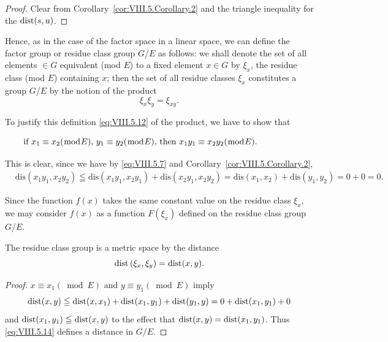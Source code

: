 \begin{proof}
 Clear from Corollary~\ref{cor:VIII.5.Corollary.2} and the triangle inequality for the $\operatorname{dist}(s, u)$. 
\end{proof}

Hence, as in the case of the factor space in a linear space, we can define the factor group or residue class group $G$/$E$ as follows: we shall denote the set of all elements $\in G$ equivalent (mod $E$) to a fixed element $x \in G$ by $\xi_{x}$, the residue class (mod $E$) containing $x$; then the set of all residue classes $\xi_{x}$ constitutes a group $G$/$E$ by the notion of the product 
\begin{equation}\label{eq:VIII.5.12}
\xi_{x} \xi_{y} = \xi_{xy}.
\end{equation}

To justify this definition \eqref{eq:VIII.5.12} of the product, we have to show that 

\begin{equation}\label{eq:VIII.5.13}
\begin{minipage}[b]{0.92\linewidth}
if $x_{1} \equiv x_{2} (\bmod E)$, $y_{1} \equiv y_{2} (\bmod E)$, then $x_{1}y_{1} \equiv x_{2}y_{2} (\bmod E)$.
\end{minipage}
\end{equation}

This is clear, since we have by \eqref{eq:VIII.5.7} and Corollary~\ref{cor:VIII.5.Corollary.2}, 
\[
\begin{aligned}
&\mathrm{dis} (x _{1} y _{1}, x _{2} y _{2})  \leqq \mathrm{dis} (x _{1} y _{1}, x _{2} y _{1}) + \mathrm{dis} (x _{2} y _{1}, x _{2} y _{2}) = \mathrm{dis} (x _{1}, x _{2}) + \mathrm{dis} (y _{1}, y _{2}) = 0 + 0 = 0.
\end{aligned}
\]

Since the function $f(x)$ takes the same constant value on the residue class $\xi_{x}$, we may consider $f(x)$ as a function $F(\xi_{x})$ defined on the residue class group $G$/$E$. 

\begin{corollary}\label{cor:VIII.5.Corollary.4} The residue class group is a metric space by the distance 
\begin{equation}\label{eq:VIII.5.14}
\operatorname{dist} \left(\xi_{x}, \xi_{y}\right) = \operatorname{dist} (x, y).
\end{equation}
\end{corollary}

\begin{proof}
 $x \equiv x_{1} (\bmod E)$ and $y \equiv y_{1} (\bmod E)$ imply 
\[
\operatorname{dist} (x, y) \leqq \operatorname{dist} (x, x _{1}) + \operatorname{dist} (x _{1}, y _{1}) + \operatorname{dist} (y _{1}, y) = 0 + \operatorname{dist} (x _{1}, y _{1}) + 0
\]
and $\operatorname{dist}(x_1, y_1) \leqq \operatorname{dist}(x, y)$ to the effect that $\operatorname{dist}(x, y) = \operatorname{dist}(x_1, y_1)$. Thus \eqref{eq:VIII.5.14} defines a distance in $G/E$. 
\end{proof}

